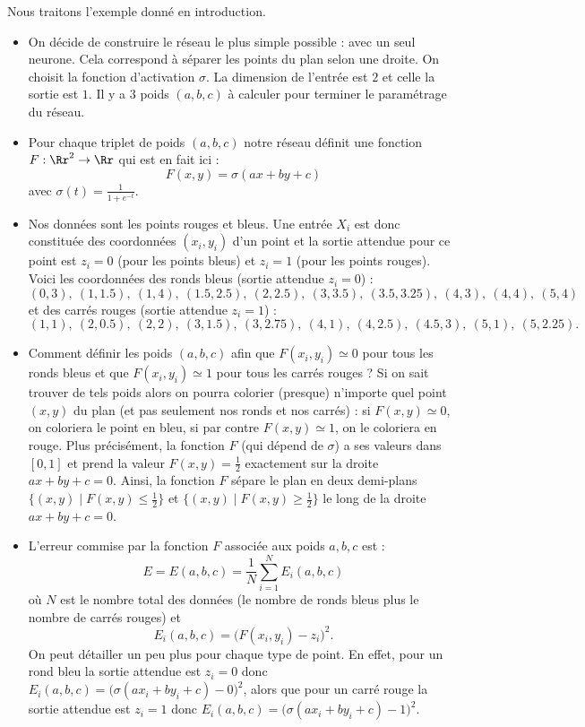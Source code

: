 \begin{exemple}{}{}
	Nous traitons l'exemple donné en introduction.
	\begin{itemize}
		\item On décide de construire le réseau le plus simple possible : avec un seul neurone. Cela correspond à séparer les points du plan selon une droite.
		On choisit la fonction d'activation $\sigma$.
		La dimension de l'entrée est $2$ et celle la sortie est $1$.
		Il y a $3$ poids $(a,b,c)$ à calculer pour terminer le paramétrage du réseau.
		
		
		\item Pour chaque triplet de poids $(a,b,c)$ notre réseau définit une fonction $F : \Rr^2 \to \Rr$
		qui est en fait ici :
		$$F(x,y) = \sigma(ax+by+c)$$
		avec $\sigma(t) = \frac{1}{1+e^{-t}}$.
		
		
		
		\item Nos données sont les points rouges et bleus.
		Une entrée $X_i$ est donc constituée des coordonnées $(x_i,y_i)$ d'un point et la sortie attendue pour ce point est $z_i = 0$ (pour les points bleus) et $z_i = 1$ (pour les points rouges).
		Voici les coordonnées des ronds bleus (sortie attendue $z_i = 0$) :
		$$(0,3),\ (1,1.5),\ (1,4),\ (1.5,2.5),\ (2,2.5),\ (3,3.5),\ (3.5,3.25),\ (4,3),\ (4,4),\ (5,4)$$
		et des carrés rouges (sortie attendue $z_i = 1$) :
		$$(1,1),\ (2,0.5),\ (2,2),\ (3,1.5),\ (3,2.75),\ (4,1),\ (4,2.5),\ (4.5,3),\ (5,1),\ (5,2.25).$$  
		
		
		\item Comment définir les poids $(a,b,c)$ afin que $F(x_i,y_i) \simeq 0$ pour tous les ronds bleus et que $F(x_i,y_i)\simeq1$ pour tous les carrés rouges ? Si on sait trouver de tels poids alors on pourra colorier (presque) n'importe quel point $(x,y)$ du plan (et pas seulement nos ronds et nos carrés) : si $F(x,y) \simeq 0$, on coloriera le point en bleu, si par contre $F(x,y) \simeq 1$, on le coloriera en rouge.
		Plus précisément, la fonction $F$ (qui dépend de $\sigma$) a ses valeurs dans $[0,1]$ et prend la valeur $F(x,y)=\frac12$ exactement sur la droite $ax+by+c=0$. Ainsi, la fonction $F$ sépare le plan en deux demi-plans $\{ (x,y) \mid F(x,y)\le\frac12\}$ et $\{ (x,y) \mid F(x,y)\ge\frac12\}$ le long de la droite $ax+by+c=0$.
		
		\item L'erreur commise par la fonction $F$ associée aux poids $a,b,c$ est :
		$$E = E(a,b,c) = \frac{1}N \sum_{i=1}^N E_i(a,b,c)$$
		où $N$ est le nombre total des données (le nombre de ronds bleus plus le nombre de carrés rouges)
		et 
		$$E_i(a,b,c) = \big( F(x_i,y_i) - z_i \big)^2.$$
		On peut détailler un peu plus pour chaque type de point.
		En effet, pour un rond bleu la sortie attendue est $z_i=0$ donc $E_i(a,b,c) = \big( \sigma(a x_i + b y_i + c) - 0 \big)^2$, alors que pour un carré rouge la sortie attendue est $z_i=1$ donc $E_i(a,b,c) = \big( \sigma(a x_i + b y_i + c) - 1 \big)^2$.
		
	\end{itemize}
\end{exemple}


